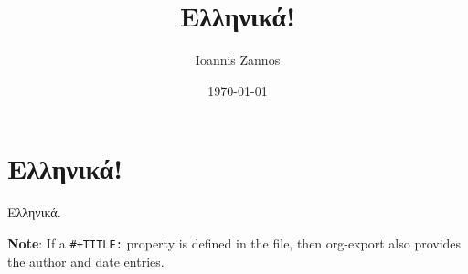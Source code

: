 \documentclass[11pt]{article}
\author{Ioannis Zannos}
\date{\today}
\title{Ελληνικά!}
\begin{document}
\maketitle
\tableofcontents


\section{Ελληνικά!}
\label{sec:org7b36386}

Ελληνικά.

\textbf{Note}: If a \texttt{\#+TITLE:} property is defined in the file, then org-export also provides the author and date entries.
\end{document}
